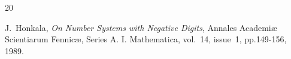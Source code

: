 \documentclass{llncs}
\newcommand{\GF}{GF}
\begin{document}
\begin{thebibliography}{20}






J.~Honkala,
\emph{On Number Systems with Negative Digits},
Annales Academiæ Scientiarum Fennicæ, Series A. I. Mathematica,
vol.~14, issue~1, pp.149-156, 1989.






\end{thebibliography}
\end{document}
